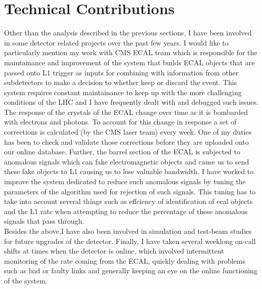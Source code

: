 \documentclass[a4paper,11pt]{article}
\begin{document}
\section{Technical Contributions}
\label{sec:tech}
Other than the analysis described in the previous sections, I have been involved in some detector related projects over the past few years. I would like to particularly mention my work with CMS ECAL team which is responsible for the maintainance and improvement of the system that builds ECAL objects that are passed onto L1 trigger as inputs for combining with information from other subdetectors to make a decision to whether keep or discard the event. This system requires constant  maintainance to keep up with the more challenging conditions of the LHC and I have frequently dealt with and debugged such issues. The response of the crystals of the ECAL change over time as it is bombarded with electrons and photons. To account for this change in response a set of corrections is calculated (by the CMS laser team) every week. One of my duties has been to check and validate those corrections before they are uploaded onto our online database. Further, the barrel section of the ECAL is subjected to anomalous signals which can fake electromagnetic objects and cause us to send these fake objects to L1 causing us to lose valuable bandwidth. I have worked to improve the system dedicated to reduce such anomalous signals by tuning the parameters of the algorithm used for rejection of such signals. This tuning has to take into account several things such as effciency of identification of ecal objects and the L1 rate when attempting to reduce the percentage of these anomalous signals that pass through.\\
Besides the above,I have also been involved in simulation and test-beam studies for future upgrades of the detector. Finally, I have taken several weeklong on-call shifts at times when the detector is online, which involved intermittent monitoring of the rate coming from the ECAL, quickly dealing with problems such as bad or faulty links and generally keeping an eye on the online functioning of the system.
\end{document}
